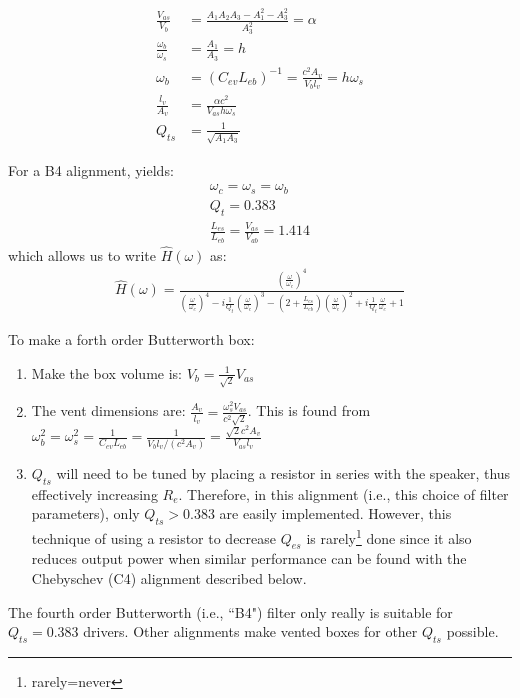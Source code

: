 \documentclass[10pt]{book}
\begin{document}
\begin{align}
\frac{V_{as}}{V_{b}}&=\frac{A_1A_2A_3-A_1^2-A_3^2}{A_3^2}=\alpha\label{eq:dimensions-start}\\
\frac{\omega_b}{\omega_s}&=\frac{A_1}{A_3}=h\\
\omega_b&=(C_{ev}L_{eb})^{-1}=\frac{c^2A_v}{V_bl_v}=h\omega_s\\
\frac{l_v}{A_v}&=\frac{\alpha c^2}{V_{as} h \omega_s}\\
Q_{ts}&=\frac{1}{\sqrt{A_1A_3}}\label{eq:dimensions-end}
\end{align}

For a B4 alignment, yields:
\begin{align}
\omega_c=\omega_s=\omega_b\\
Q_t=0.383\\
\frac{L_{es}}{L_{eb}}=\frac{V_{as}}{V_{ab}}=1.414
\end{align}
which allows us to write $\hat{H}(\omega)$ as:
\begin{align}
\hat{H}(\omega)=\frac{\left(\frac{\omega}{\omega_c}\right)^4}
{\left(\frac{\omega}{\omega_c}\right)^4-i\frac{1}{Q_t}\left(\frac{\omega}{\omega_c}\right)^3-\left(2+\frac{L_{es}}{L_{eb}}\right)\left(\frac{\omega}{\omega_c}\right)^2+i\frac{1}{Q_t}\frac{\omega}{\omega_c}+1}
\end{align}

To make a forth order Butterworth box:
\begin{enumerate}
\item Make the box volume is: $V_b=\frac{1}{\sqrt{2}}V_{as}$
\item The vent dimensions are: $\frac{A_v}{l_v}=\frac{\omega_s^2 V_{as}}{c^2\sqrt{2}}$. This is found from $\omega_b^2=\omega_s^2=\frac{1}{C_{ev}L_{eb}}=\frac{1}{V_b l_v/(c^2 A_v)}=\frac{\sqrt{2}c^2 A_v}{V_{as}l_v}$
\item $Q_{ts}$ will need to be tuned by placing a resistor in series with the speaker, thus effectively increasing $R_e$. Therefore, in this alignment (i.e., this choice of filter parameters), only $Q_{ts}>0.383$ are easily implemented. However, this technique of using a resistor to decrease $Q_{es}$ is rarely\footnote{rarely=never} done since it also reduces output power when similar performance can be found with the Chebyschev (C4) alignment described below.
\end{enumerate}

The fourth order Butterworth (i.e., ``B4") filter only really is suitable for $Q_{ts}=0.383$ drivers. Other alignments make vented boxes for other $Q_{ts}$ possible.
\end{document}
